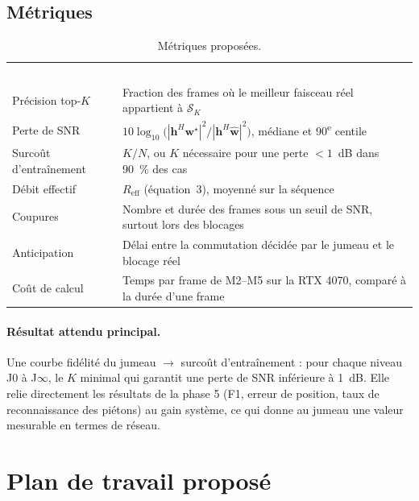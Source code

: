 \documentclass[11pt,a4paper]{article}
\newcommand{\hd}[1]{\textcolor{white}{\textbf{#1}}}
\begin{document}
\subsection{Métriques}
\begin{table}[H]
\centering
\caption{Métriques proposées.}
\label{tab:metriques}
\begin{tabularx}{\linewidth}{B{4.2cm} L}
\hd{Métrique} & \hd{Définition} \\
Précision top-$K$ & Fraction des frames où le meilleur faisceau réel appartient à $\mathcal{S}_K$ \\
Perte de SNR & $10\log_{10}\bigl(|\mathbf{h}^H\mathbf{w}^\star|^2 / |\mathbf{h}^H\hat{\mathbf{w}}|^2\bigr)$, médiane et 90\textsuperscript{e} centile \\
Surcoût d'entraînement & $K/N$, ou $K$ nécessaire pour une perte $< 1$~dB dans 90~\% des cas \\
Débit effectif & $R_{\text{eff}}$ (équation~3), moyenné sur la séquence \\
Coupures & Nombre et durée des frames sous un seuil de SNR, surtout lors des blocages \\
Anticipation & Délai entre la commutation décidée par le jumeau et le blocage réel \\
Coût de calcul & Temps par frame de M2--M5 sur la RTX 4070, comparé à la durée d'une frame \\
\end{tabularx}
\end{table}

\paragraph{Résultat attendu principal.} Une courbe \og fidélité du jumeau $\to$ surcoût
d'entraînement \fg{} : pour chaque niveau J0 à J$\infty$, le $K$ minimal qui garantit une perte de
SNR inférieure à 1~dB. Elle relie directement les résultats de la phase 5 (F1, erreur de position,
taux de reconnaissance des piétons) au gain système, ce qui donne au jumeau une valeur mesurable
en termes de réseau.

\section{Plan de travail proposé}
\end{document}
